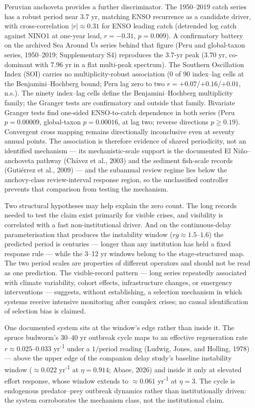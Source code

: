 \documentclass[11pt]{article}
\begin{document}
Peruvian anchoveta provides a further discriminator. The 1950--2019
catch series has a robust period near 3.7 yr, matching ENSO recurrence
as a candidate driver, with cross-correlation \(|r|\approx0.31\) for
ENSO leading catch (detrended log catch against NINO1 at one-year lead,
\(r=-0.31\), \(p=0.009\)). A confirmatory battery on the archived Sea Around Us
series behind that figure (Peru and global-taxon series, 1950--2019;
Supplementary S4) reproduces the 3.7-yr peak (3.70 yr, co-dominant with
7.96 yr in a flat multi-peak spectrum). The Southern Oscillation Index (SOI)
carries no multiplicity-robust association (0 of 90 index--lag cells at
the Benjamini--Hochberg bound; Peru lag zero to two \(r=+0.07\)/\(+0.16\)/\(+0.01\),
n.s.). The ninety index--lag cells define the Benjamini--Hochberg
multiplicity family; the Granger tests are confirmatory and outside that
family. Bivariate Granger tests find one-sided ENSO-to-catch dependence
in both series (Peru \(p=0.00009\), global-taxon \(p=0.00016\), at lag
two; reverse directions \(p\ge0.19\)). Convergent cross mapping remains
directionally inconclusive even at seventy annual points. The association
is therefore evidence of shared periodicity, not an identified mechanism
--- its mechanistic-scale support is the documented El Ni\~no--anchoveta
pathway (Ch\'avez et al., 2003) and the sediment fish-scale records
(Guti\'errez et al., 2009) --- and the subannual review regime lies below
the anchovy-class review-interval response region, so the unclassified
controller prevents that comparison from testing the mechanism.

Two structural hypotheses may help explain the zero count. The long
records needed to test the claim exist primarily for visible crises, and
visibility is correlated with a fast non-institutional driver. And on
the continuous-delay parameterisation that produces the instability
window (\(rg \approx 1.5\)--\(1.6\)) the predicted period is centuries
--- longer than any institution has held a fixed response rule --- while
the 3--12 yr windows belong to the stage-structured map. The two period
scales are properties of different operators and should not be read as
one prediction. The visible-record pattern --- long series repeatedly associated
with climate variability, cohort effects, infrastructure changes, or
emergency interventions --- suggests, without establishing, a selection
mechanism in which systems receive intensive monitoring after complex
crises; no causal identification of selection bias is claimed.

One documented system sits at the window's edge rather than inside it.
The spruce budworm's 30--40 yr outbreak cycle maps to an effective
regeneration rate \(r \approx 0.025\)--\(0.033\) yr\textsuperscript{-1} under a
\(1/\mathrm{period}\) reading (Ludwig, Jones, and Holling, 1978) ---
above the upper edge of the companion delay study's baseline instability
window (\(\approx 0.022\) yr\textsuperscript{-1} at \(\eta = 0.914\); Abaee, 2026) and inside it only at elevated effort response, whose window
extends to \(\approx 0.061\) yr\textsuperscript{-1} at \(\eta = 3\). The cycle is
endogenous predator--prey outbreak dynamics rather than institutionally
driven: the system corroborates the mechanism class, not the
institutional claim.
\end{document}

